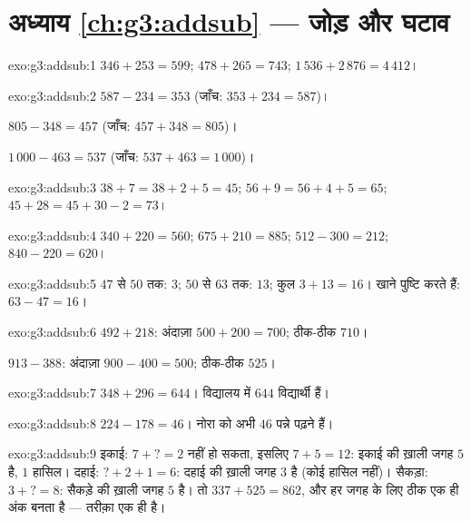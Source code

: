 \section*{अध्याय \ref{ch:g3:addsub} --- जोड़ और घटाव}

\begin{solution}{exo:g3:addsub:1}
$346 + 253 = 599$; \quad
$478 + 265 = 743$; \quad
$1\,536 + 2\,876 = 4\,412$।
\end{solution}

\begin{solution}{exo:g3:addsub:2}
$587 - 234 = 353$ (जाँच: $353 + 234 = 587$)।

$805 - 348 = 457$ (जाँच: $457 + 348 = 805$)।

$1\,000 - 463 = 537$ (जाँच: $537 + 463 = 1\,000$)।
\end{solution}

\begin{solution}{exo:g3:addsub:3}
$38 + 7 = 38 + 2 + 5 = 45$; \quad
$56 + 9 = 56 + 4 + 5 = 65$; \quad
$45 + 28 = 45 + 30 - 2 = 73$।
\end{solution}

\begin{solution}{exo:g3:addsub:4}
$340 + 220 = 560$; \quad $675 + 210 = 885$; \quad
$512 - 300 = 212$; \quad $840 - 220 = 620$।
\end{solution}

\begin{solution}{exo:g3:addsub:5}
$47$ से $50$ तक: $3$; $50$ से $63$ तक: $13$; कुल
$3 + 13 = 16$। खाने पुष्टि करते हैं: $63 - 47 = 16$।
\end{solution}

\begin{solution}{exo:g3:addsub:6}
$492 + 218$: अंदाज़ा $500 + 200 = 700$; ठीक-ठीक $710$।

$913 - 388$: अंदाज़ा $900 - 400 = 500$; ठीक-ठीक $525$।
\end{solution}

\begin{solution}{exo:g3:addsub:7}
$348 + 296 = 644$। विद्यालय में $644$ विद्यार्थी हैं।
\end{solution}

\begin{solution}{exo:g3:addsub:8}
$224 - 178 = 46$। नोरा को अभी $46$ पन्ने पढ़ने हैं।
\end{solution}

\begin{solution}{exo:g3:addsub:9}
इकाई: $7 + \text{?} = 2$ नहीं हो सकता, इसलिए $7 + 5 = 12$: इकाई
की ख़ाली जगह $5$ है, $1$ हासिल। दहाई: $\text{?} + 2 + 1 = 6$:
दहाई की ख़ाली जगह $3$ है (कोई हासिल नहीं)। सैकड़ा:
$3 + \text{?} = 8$: सैकड़े की ख़ाली जगह $5$ है। तो
$337 + 525 = 862$, और हर जगह के लिए ठीक एक ही अंक बनता है --- तरीक़ा एक ही है।
\end{solution}

